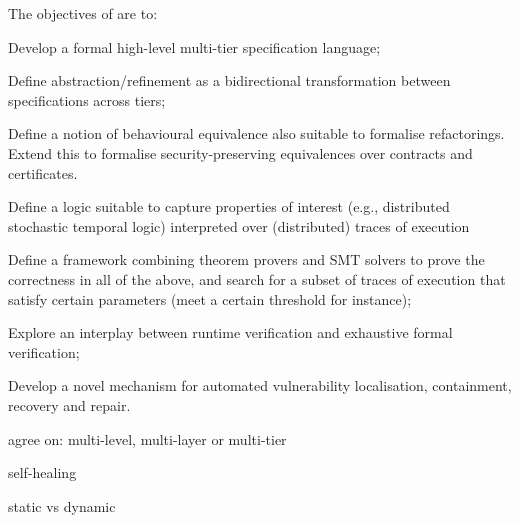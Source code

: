 \addtocounter{wpno}{1}
\begin{Workpackage}{\thewpno}
\WPTitle{\wpname{\thewpno}}


\begin{WPObjectives}
The objectives of \theWP{} are to:
\begin{compactitem}
\item Develop a formal high-level multi-tier specification language; %
\item Define abstraction/refinement as a bidirectional transformation between specifications across tiers;
\item Define a notion of behavioural equivalence also suitable to formalise refactorings. Extend this to formalise security-preserving equivalences over contracts and certificates.
\item Define a logic suitable to capture 
properties of interest (e.g., distributed stochastic temporal logic) interpreted over (distributed) traces of execution 
\item Define a framework combining theorem provers and SMT solvers to prove the correctness in all of the above, and search for a subset of traces of execution that satisfy certain parameters (meet a certain threshold for instance);
\item Explore an interplay between runtime verification and exhaustive formal verification;
\item Develop a novel mechanism for automated 
vulnerability localisation, containment, recovery and repair.

\end{compactitem}

\vspace*{1cm}


agree on: multi-level, multi-layer or multi-tier

self-healing

static vs dynamic


\end{WPObjectives}
\end{Workpackage}
